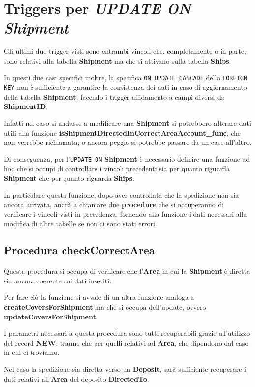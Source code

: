 \newpage
\section{Triggers per \textit{UPDATE ON Shipment}}

Gli ultimi due trigger visti sono entrambi vincoli che, completamente o in parte, sono relativi alla tabella \textbf{Shipment} ma che si attivano sulla tabella \textbf{Ships}.

In questi due casi specifici inoltre, la specifica \lstinline{ON UPDATE CASCADE} della \lstinline{FOREIGN KEY} non è sufficiente a garantire la consistenza dei dati in caso di aggiornamento della tabella \textbf{Shipment}, facendo i trigger affidamento a campi diversi da \textbf{ShipmentID}.

Infatti nel caso si andasse a modificare una \textbf{Shipment} si potrebbero alterare dati utili alla funzione \textbf{isShipmentDirectedInCorrectAreaAccount\_func}, che non verrebbe richiamata, o ancora peggio si potrebbe passare da un caso all'altro. 

Di conseguenza, per l'\lstinline{UPDATE ON} \textbf{Shipment} è necessario definire una funzione ad hoc che si occupi di controllare i vincoli precedenti sia per quanto riguarda \textbf{Shipment} che per quanto riguarda \textbf{Ships}.

In particolare questa funzione, dopo aver controllata che la spedizione non sia ancora arrivata, andrà a chiamare due \textbf{procedure} che si occuperanno di verificare i vincoli visti in precedenza, fornendo alla funzione i dati necessari alla modifica di altre tabelle se non ci sono stati errori.
\subsection{Procedura \textbf{checkCorrectArea}}

Questa procedura si occupa di verificare che l'\textbf{Area} in cui la \textbf{Shipment} è diretta sia ancora coerente coi dati inseriti.

Per fare ciò la funzione si avvale di un altra funzione analoga a \textbf{createCoversForShipment} ma che si occupa dell'update, ovvero \textbf{updateCoversForShipment}.

I parametri necessari a questa procedura sono tutti recuperabili grazie all'utilizzo del record \textbf{NEW}, tranne che per quelli relativi ad \textbf{Area}, che dipendono dal caso in cui ci troviamo.

Nel caso la spedizione sia diretta verso un \textbf{Deposit}, sarà sufficiente recuperare i dati relativi all'\textbf{Area} del deposito \textbf{DirectedTo}.

